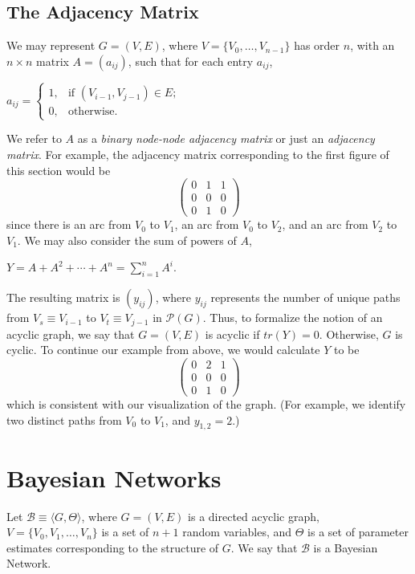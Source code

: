 \documentclass[12pt,twoside]{reedthesis}
\begin{document}
	\subsection*{The Adjacency Matrix}
	We may represent $G=(V,E)$, where $V = \{V_0, \ldots, V_{n-1} \}$ has order $n$, with an $n \times n$ matrix $A = (a_{ij})$, such that for each entry $a_{ij}$, 
	\begin{center}
	 	$a_{ij} = 
		\begin{cases} 1, & \textrm{if\ \ \ } (V_{i-1},V_{j-1}) \in E; \\
		0, & \textrm{otherwise}. \end{cases}$
	 \end {center}
	We refer to $A$ as a {\em binary node-node adjacency matrix} or just an {\em adjacency matrix}. For example, the adjacency matrix corresponding to the first figure of this section would be
	\[
	\begin{pmatrix}
	0 & 1 & 1 \\
	0 & 0 & 0 \\
	0 & 1 & 0
	\end{pmatrix} \]
	since there is an arc from $V_0$ to $V_1$, an arc from $V_0$ to $V_2$, and an arc from $V_2$ to $V_1$. We may also consider the sum of powers of $A$,
	\begin{center}
		$Y = A + A^2 + \cdots + A^n = \displaystyle\sum_{i=1}^{n} A^{i}$.
	\end{center}
	The resulting matrix is $(y_{ij})$, where $y_{ij}$ represents the number of unique paths from $V_s \equiv V_{i-1}$ to $V_t \equiv V_{j-1}$ in $\mathcal P(G)$. 
	Thus, to formalize the notion of an acyclic graph, we say that $G=(V,E)$ is acyclic if $tr(Y) = 0$. 
	Otherwise, $G$ is cyclic.
	To continue our example from above, we would calculate $Y$ to be
	\[
	\begin{pmatrix}
	0 & 2 & 1 \\
	0 & 0 & 0 \\
	0 & 1 & 0
	\end{pmatrix} \]
	which is consistent with our visualization of the graph. 
	(For example, we identify two distinct paths from $V_0$ to $V_1$, and $y_{1,2} = 2$.)
	
	\section{Bayesian Networks}	
	Let $\mathcal{B} \equiv \langle G, \Theta \rangle$, where $G = (V,E)$ is a directed acyclic graph, $V = \{V_0, V_1, \ldots, V_n \}$ is a set of $n + 1$ random variables, and $\Theta$ is a set of parameter estimates corresponding to the structure of $G$. We say that $\mathcal{B}$ is a Bayesian Network.
\end{document}
